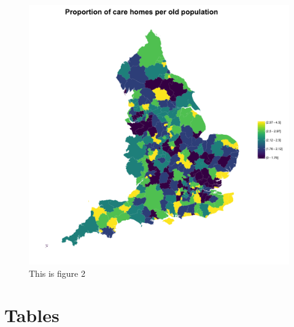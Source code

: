 \begin{figure}[!h]
\centering
  \caption{This is figure 2}
    \label{fig: maps2}
    
\includegraphics[width=1\textwidth]{ch_2/map_care_homes.png}


\end{figure}


\newpage
\section{Tables}
\label{sec: tables}


